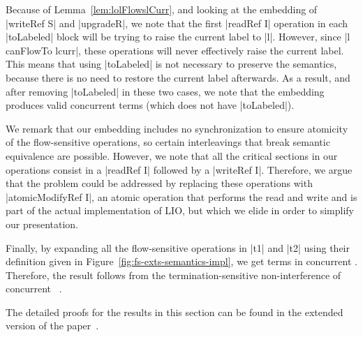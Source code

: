 \begin{proofsketch} Because of Lemma~\ref{lem:lolFlowslCurr}, and
  looking at the embedding of |writeRef S| and |upgradeR|, we note
  that the first |readRef I| operation in each |toLabeled| block will
  be trying to raise the current label to |l|. However, since |l
  canFlowTo lcurr|, these operations will never effectively raise the
  current label. This means that using |toLabeled| is not necessary to
  preserve the semantics, because there is no need to restore the
  current label afterwards. As a result, and after removing
  |toLabeled| in these two cases, we note that the embedding produces
  valid concurrent \lio{} terms (which does not have |toLabeled|).

  We remark that our embedding includes no synchronization to
  ensure atomicity of the flow-sensitive operations, so certain
  interleavings that break semantic equivalence are possible. However,
  we note that all the critical sections in our operations consist in
  a |readRef I| followed by a |writeRef I|. Therefore, we argue that
  the problem could be addressed by replacing these operations with
  |atomicModifyRef I|, an atomic operation that performs the read and write and
  is part of the actual implementation of LIO, but which we elide in order to
  simplify our presentation.

  Finally, by expanding all the flow-sensitive operations in |t1| and |t2|
  using their definition given in
  Figure~\ref{fig:fs-exts-semantics-impl}, we get terms in concurrent
  \lio{}.  Therefore, the result follows from the
  termination-sensitive non-interference of concurrent
  \lio{}~\citep{stefan:addressing-covert}.
\end{proofsketch}

The detailed proofs for the results in this section can be found in the
extended version of the paper~\cite{extended}.


